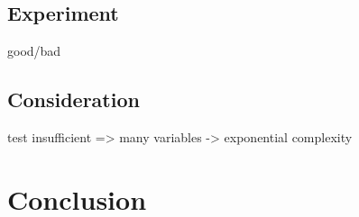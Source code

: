 \documentclass[12pt, a4paper, titlepage]{report}
\begin{document}
  \section{Experiment}
  good/bad
  \section{Consideration}
  test insufficient => many variables -> exponential complexity

\chapter{Conclusion}\label{chapter:conclusion}



\end{document}

